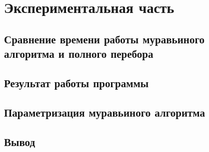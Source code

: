 \chapter{Экспериментальная часть}


\section{Сравнение времени работы муравьиного алгоритма и полного перебора}

\section{Результат работы программы}

\section{Параметризация муравьиного алгоритма}

\section{Вывод}

